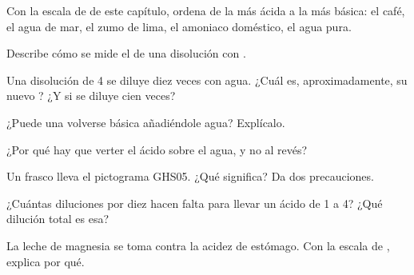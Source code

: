 \begin{exercise}[$\star$]\label{exo:g9:acids-bases-ph:3}
Con la escala de  de este capítulo, ordena de la más ácida a la más
básica: el café, el agua de mar, el zumo de lima, el amoniaco doméstico,
el agua pura.
\end{exercise}

\begin{exercise}[$\star$]\label{exo:g9:acids-bases-ph:4}
Describe cómo se mide el  de una disolución con .
\end{exercise}

\begin{exercise}[$\star\star$]\label{exo:g9:acids-bases-ph:5}
Una disolución de  4 se diluye diez veces con agua. ¿Cuál es,
aproximadamente, su nuevo ? ¿Y si se diluye cien veces?
\end{exercise}

\begin{exercise}[$\star\star$]\label{exo:g9:acids-bases-ph:6}
¿Puede una  volverse básica añadiéndole agua? Explícalo.
\end{exercise}

\begin{exercise}[$\star\star$]\label{exo:g9:acids-bases-ph:7}
¿Por qué hay que verter el ácido sobre el agua, y no al revés?
\end{exercise}

\begin{exercise}[$\star\star$]\label{exo:g9:acids-bases-ph:8}
Un frasco lleva el pictograma GHS05. ¿Qué significa? Da dos
precauciones.
\end{exercise}

\begin{exercise}[$\star\star$]\label{exo:g9:acids-bases-ph:9}
¿Cuántas diluciones por diez hacen falta para llevar un ácido de  1 a
 4? ¿Qué dilución total es esa?
\end{exercise}

\begin{exercise}[$\star\star$]\label{exo:g9:acids-bases-ph:10}
La leche de magnesia se toma contra la acidez de estómago. Con la escala
de , explica por qué.
\end{exercise}

